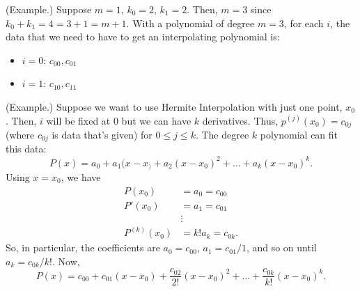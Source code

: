 \documentclass[letterpaper]{article}
\begin{document}
\begin{mdframed}[nobreak=true]
    (Example.) Suppose $m = 1$, $k_0 = 2$, $k_1 = 2$. Then, $m = 3$ since $k_0 + k_1 = 4 = 3 + 1 = m + 1$. With a polynomial of degree $m = 3$, for each $i$, the data that we need to have to get an interpolating polynomial is: 
    \begin{itemize}
        \item $i = 0$: $c_{00}, c_{01}$
        \item $i = 1$: $c_{10}, c_{11}$
    \end{itemize}
\end{mdframed}

\begin{mdframed}
    (Example.) Suppose we want to use Hermite Interpolation with just one point, $x_0$. Then, $i$ will be fixed at 0 but we can have $k$ derivatives. Thus, $p^{(j)}(x_0) = c_{0j}$ (where $c_{0j}$ is data that's given) for $0 \leq j \leq k$. The degree $k$ polynomial can fit this data: 
    \[P(x) = a_0 + a_1 (x - x_) + a_2 (x - x_0)^2 + \hdots + a_k (x - x_0)^k.\]
    Using $x = x_0$, we have 
    \[\begin{aligned}
        P(x_0) &= a_0 = c_{00} \\
        P'(x_0) &= a_1 = c_{01} \\ 
        &\vdots \\ 
        P^{(k)}(x_0) &= k! a_k = c_{0k}.
    \end{aligned}\]
    So, in particular, the coefficients are $a_0 = c_{00}$, $a_1 = c_{01} / 1$, and so on until $a_k = c_{0k} / k!$. Now, 
    \[P(x) = c_{00} + c_{01}(x - x_0) + \frac{c_{02}}{2!}(x - x_0)^2 + \hdots + \frac{c_{0k}}{k!}(x - x_0)^k.\]
\end{mdframed}
\end{document}
